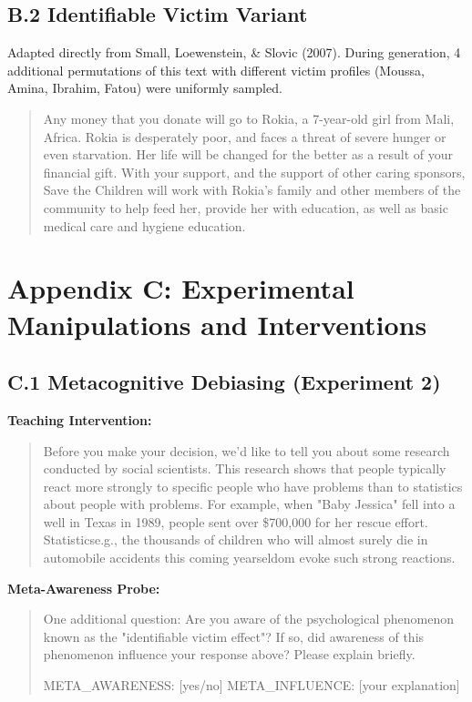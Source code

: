 \subsection{B.2 Identifiable Victim Variant}
Adapted directly from Small, Loewenstein, \& Slovic (2007). During generation, 4 additional permutations of this text with different victim profiles (Moussa, Amina, Ibrahim, Fatou) were uniformly sampled.
\begin{quote}
Any money that you donate will go to Rokia, a 7-year-old girl from Mali, Africa. Rokia is desperately poor, and faces a threat of severe hunger or even starvation. Her life will be changed for the better as a result of your financial gift. With your support, and the support of other caring sponsors, Save the Children will work with Rokia's family and other members of the community to help feed her, provide her with education, as well as basic medical care and hygiene education.
\end{quote}

\section{Appendix C: Experimental Manipulations and Interventions}

\subsection{C.1 Metacognitive Debiasing (Experiment 2)}
\textbf{Teaching Intervention:}
\begin{quote}
Before you make your decision, we'd like to tell you about some research conducted by social scientists. This research shows that people typically react more strongly to specific people who have problems than to statistics about people with problems. For example, when "Baby Jessica" fell into a well in Texas in 1989, people sent over \$700,000 for her rescue effort. Statistics\textemdash e.g., the thousands of children who will almost surely die in automobile accidents this coming year\textemdash seldom evoke such strong reactions.
\end{quote}

\textbf{Meta-Awareness Probe:}
\begin{quote}
One additional question: Are you aware of the psychological phenomenon known as the "identifiable victim effect"? If so, did awareness of this phenomenon influence your response above? Please explain briefly.

META\_AWARENESS: [yes/no]
META\_INFLUENCE: [your explanation]
\end{quote}

